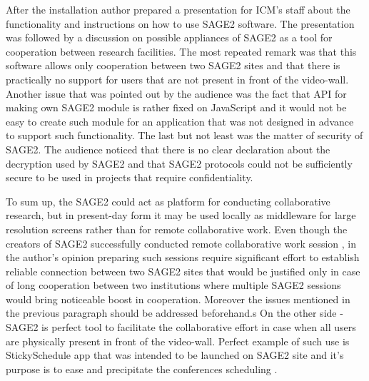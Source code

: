 \documentclass[magisterska,en]{pracamgr}
\begin{document}
 After the installation author prepared a presentation for ICM's staff about the functionality and instructions on how to use SAGE2 software. The presentation was followed by a discussion on possible appliances of SAGE2 as a tool for cooperation between research facilities. The most repeated remark was that this software allows only cooperation between two SAGE2 sites and that there is practically no support for users that are not present in front of the video-wall. Another issue that was pointed out by the audience was the fact that API for making own SAGE2 module is rather fixed on JavaScript and it would not be easy to create such module for an application that was not designed in advance to support such functionality. The last but not least was the matter of security of SAGE2. The audience noticed that there is no clear declaration about the decryption used by SAGE2 and that SAGE2 protocols could not be sufficiently secure to be used in projects that require confidentiality.
 
 To sum up, the SAGE2 could act as platform for conducting collaborative research, but in present-day form it may be used locally as middleware for large resolution screens rather than for remote collaborative work. Even though the creators of SAGE2 successfully conducted remote collaborative work session \cite{SAGE2_developers}, in the author's opinion preparing such sessions require significant effort to establish reliable connection between two SAGE2 sites that would be justified only in case of long cooperation between two institutions where multiple SAGE2 sessions would bring noticeable boost in cooperation. Moreover the issues mentioned in the previous paragraph should be addressed beforehand.s On the other side - SAGE2 is perfect tool to facilitate the collaborative effort in case when all users are physically present in front of the video-wall. Perfect example of such use is StickySchedule app that was intended to be launched on SAGE2 site and it's purpose is to ease and precipitate the conferences scheduling \cite{SAGE2_Conference_Scheduling}.
 
\end{document}
